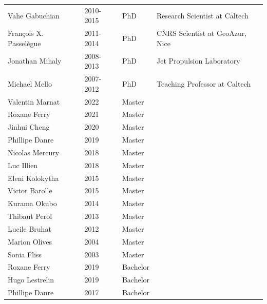 \documentclass[10pt]{article}
\begin{document}
\begin{table}[h!]
\begin{tabular}{L{3.5cm}L{2cm}L{2cm}D{6cm}}
\color{gray}Vahe Gabuchian		  & 2010-2015         &  PhD        &  Research Scientist at Caltech\\
\color{gray}François X. Passelègue& 2011-2014         &  PhD        &  CNRS Scientist at GeoAzur, Nice\\
\color{gray}Jonathan Mihaly       & 2008-2013         &  PhD        &  Jet Propulsion Laboratory\\
\color{gray}Michael Mello         & 2007-2012         &  PhD        &  Teaching Professor at Caltech\\[16pt]
\color{gray}Valentin Marnat	  	  & 2022              &  Master     &  \\
\color{gray}Roxane Ferry    	  	  & 2021              &  Master     &  \\
\color{gray}Jinhui Cheng    	      & 2020              &  Master     &  \\
\color{gray}Phillipe Danre    	  & 2019              &  Master     &  \\
\color{gray}Nicolas Mercury    	  & 2018              &  Master     &  \\
\color{gray}Luc Illien      	      & 2018              &  Master     &  \\
\color{gray}Eleni Kolokytha    	  & 2015              &  Master     &  \\
\color{gray}Victor Barolle    	  & 2015              &  Master     &  \\
\color{gray}Kurama Okubo      	  & 2014              &  Master     &  \\
\color{gray}Thibaut Perol      	  & 2013              &  Master     &  \\
\color{gray}Lucile Bruhat      	  & 2012              &  Master     &  \\
\color{gray}Marion Olives      	  & 2004              &  Master     &  \\
\color{gray}Sonia Fliss      	  & 2003              &  Master     &  \\[16pt]
\color{gray}Roxane Ferry    	      & 2019              &  Bachelor   &  \\
\color{gray}Hugo Lestrelin    	  & 2019              &  Bachelor   &  \\
\color{gray}Phillipe Danre    	  & 2017              &  Bachelor   &  \\[12pt]
\end{tabular}
\end{table}\\
\end{document}
